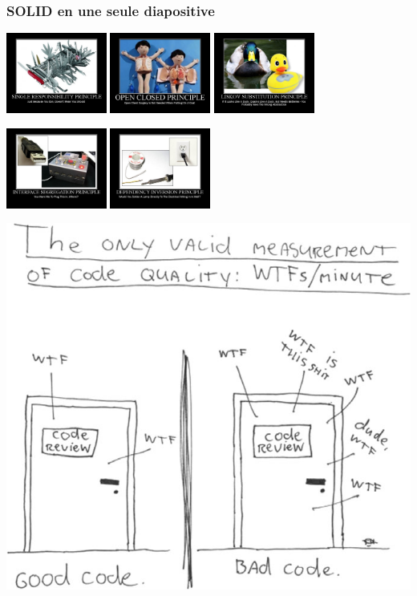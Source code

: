 \begin{frame}
    \frametitle{SOLID en une seule diapositive}

    \centering
    \includegraphics[height=100px]{figures/pratiques/srp}
    \includegraphics[height=100px]{figures/pratiques/ocp}
    \includegraphics[height=100px]{figures/pratiques/lsp}

    \includegraphics[height=100px]{figures/pratiques/isp}
    \includegraphics[height=100px]{figures/pratiques/dip}

\end{frame}

\begin{frame}
    \centering
    \includegraphics[height=0.5\linewidth]{figures/pratiques/wtf}
\end{frame}

